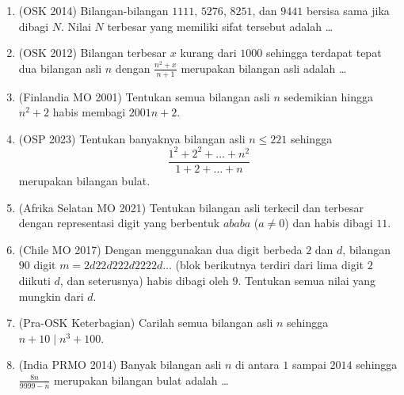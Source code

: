 \documentclass[12pt]{scrartcl}
\begin{document}
\begin{enumerate}
	\item (OSK 2014)
	Bilangan-bilangan $1111$, $5276$, $8251$, dan $9441$ bersisa sama jika dibagi $N$.
	Nilai $N$ terbesar yang memiliki sifat tersebut adalah \dots

	\item (OSK 2012)
	Bilangan terbesar $x$ kurang dari $1000$ sehingga terdapat tepat dua bilangan asli $n$
	dengan $\frac{n^2 + x}{n + 1}$ merupakan bilangan asli adalah \dots

	\item (Finlandia MO 2001)
	Tentukan semua bilangan asli $n$ sedemikian hingga $n^2 + 2$ habis membagi $2001n + 2$.

	\item (OSP 2023)
	Tentukan banyaknya bilangan asli $n \le 221$ sehingga
	\[ \frac{1^2 + 2^2 + \dots + n^2}{1 + 2 + \dots + n} \]
	merupakan bilangan bulat.

	\item (Afrika Selatan MO 2021)
	Tentukan bilangan asli terkecil dan terbesar dengan representasi digit
	yang berbentuk $ababa$ ($a \ne 0$) dan habis dibagi $11$.

	\item (Chile MO 2017)
	Dengan menggunakan dua digit berbeda $2$ dan $d$,
	bilangan $90$ digit $m = 2d22d222d2222d\ldots$ (blok berikutnya terdiri dari
	lima digit $2$ diikuti $d$, dan seterusnya) habis dibagi oleh $9$.
	Tentukan semua nilai yang mungkin dari $d$.

	\item (Pra-OSK Keterbagian)
	Carilah semua bilangan asli $n$ sehingga $n + 10 \mid n^3 + 100$.

	\item (India PRMO 2014)
	Banyak bilangan asli $n$ di antara $1$ sampai $2014$ sehingga
	$\frac{8n}{9999 - n}$ merupakan bilangan bulat adalah \dots


\end{enumerate}
\end{document}
